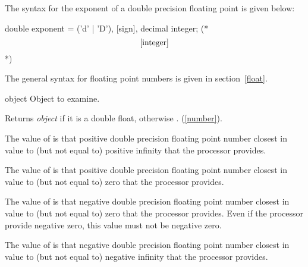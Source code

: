 \begin{optDefinition}
The syntax for the exponent of a double precision floating point is given below:

\savesyntax\doubleFloatSyntax\vbox{\syntax
double exponent
   = ('d' | 'D'), [sign], decimal integer; (* \[\ref{integer}\] *)
\endsyntax}

The general syntax for floating point numbers is given in section~\ref{float}.

%
\begin{arguments}
    \item[object] Object to examine.
\end{arguments}
%
\result%
Returns {\em object\/} if it is a double float, otherwise \nil{}.
%
\seealso%
 (\ref{number}).

%
\remarks%
The value of  is that positive double
precision floating point number closest in value to (but not equal to) positive
infinity that the processor provides.

%
\remarks%
The value of  is that positive double
precision floating point number closest in value to (but not equal to) zero that
the processor provides.

%
\remarks%
The value of  is that negative double
precision floating point number closest in value to (but not equal to) zero that
the processor provides.  Even if the processor provide negative zero, this value
must not be negative zero.

%
\remarks%
The value of  is that negative double
precision floating point number closest in value to (but not equal to) negative
infinity that the processor provides.


\end{optDefinition}
